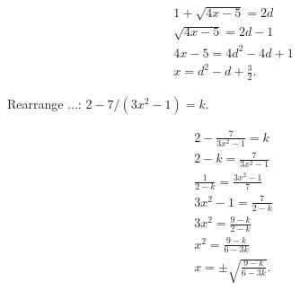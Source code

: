 \documentclass[8pt]{article}
\begin{document}
		\solution

		\begin{align*}
			1 + \sqrt{4x-5} = 2d\\
			\sqrt{4x-5} = 2d - 1\\
			4x-5 = 4d^2 - 4d + 1\\
			x = d^2 - d + \frac{3}{2}.
		\end{align*}

		\prob Rearrange ...: \(2 - 7/(3x^2-1) = k\).

		\solution

		\begin{align*}
			2 - \frac{7}{3x^2 - 1} = k\\
			2 - k = \frac{7}{3x^2 - 1}\\
			\frac{1}{2-k} = \frac{3x^2 - 1}{7}\\
			3x^2 - 1 = \frac{7}{2-k}\\
			3x^2 = \frac{9-k}{2-k}\\
			x^2 = \frac{9-k}{6-3k}\\
			x = \pm \sqrt{\frac{9-k}{6-3k}}.
		\end{align*}
\end{document}
